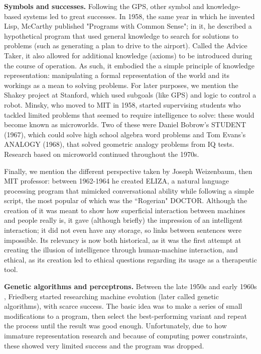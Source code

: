 \documentclass[../main.tex]{subfiles}
\begin{document}
\vspace{4pt}
\textbf{Symbols and successes.} Following the GPS, other symbol and knowledge-based systems led to great successes. In 1958, the same year in which he invented Lisp, McCarthy published "Programs with Common Sense"; in it, he described a hypothetical program that used general knowledge to search for solutions to problems (such as generating a plan to drive to the airport). Called the Advice Taker, it also allowed for additional knowledge (axioms) to be introduced during the course of operation. As such, it embodied the a simple principle of knowledge representation: manipulating a formal representation of the world and its workings as a mean to solving problems. For later purposes, we mention the Shakey project at Stanford, which used subgoals (like GPS) and logic to control a robot. Minsky, who moved to MIT in 1958, started supervising students who tackled limited problems that seemed to require intelligence to solve: these would become known as microworlds. Two of these were Daniel Bobrow's STUDENT (1967), which could solve high school algebra word problems and Tom Evans's ANALOGY (1968), that solved geometric analogy problems from IQ tests. Research based on microworld continued throughout the 1970s.

Finally, we mention the different perspective taken by Joseph Weizenbaum, then MIT professor: between 1962-1964 he created ELIZA, a natural language processing program that mimicked conversational ability while following a simple script, the most popular of which was the ``Rogerian" DOCTOR. Although the creation of it was meant to show how superficial interaction between machines and people really is, it gave (although briefly) the impression of an intelligent interaction; it did not even have any storage, so links between sentences were impossible. Its relevancy is now both historical, as it was the first attempt at creating the illusion of intelligence through human-machine interaction, and ethical, as its creation led to ethical questions regarding its usage as a therapeutic tool.

\vspace{4pt}
\textbf{Genetic algorithms and perceptrons.} Between the late 1950s and early 1960s \cite{friedbergLearningMachinePart1958}, Friedberg started researching machine evolution (later called genetic algorithms), with scarce success. The basic idea was to make a series of small modifications to a program, then select the best-performing variant and repeat the process until the result was good enough. Unfortunately, due to how immature representation research and because of computing power constraints, these showed very limited success and the program was dropped.
\end{document}
